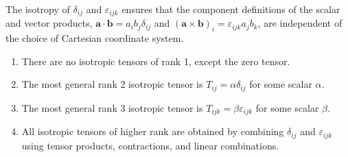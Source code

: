 \documentclass[a4paper]{article}
\begin{document}
\begin{rmk}
  The isotropy of $\delta_{ij}$ and $\varepsilon_{ijk}$ ensures that the component definitions of the scalar and vector products, $\mathbf{a}\cdot \mathbf{b} = a_i b_j \delta_{ij}$ and $(\mathbf{a}\times \mathbf{b})_i = \varepsilon_{ijk} a_j b_k$, are independent of the choice of Cartesian coordinate system.
\end{rmk}

\begin{thm}\leavevmode
  \begin{enumerate}
    \item There are no isotropic tensors of rank 1, except the zero tensor.
    \item The most general rank 2 isotropic tensor is $T_{ij} = \alpha \delta_{ij}$ for some scalar $\alpha$.
    \item The most general rank 3 isotropic tensor is $T_{ijk} = \beta \varepsilon_{ijk}$ for some scalar $\beta$.
    \item All isotropic tensors of higher rank are obtained by combining $\delta_{ij}$ and $\varepsilon_{ijk}$ using tensor products, contractions, and linear combinations.
  \end{enumerate}
\end{thm}
\end{document}
